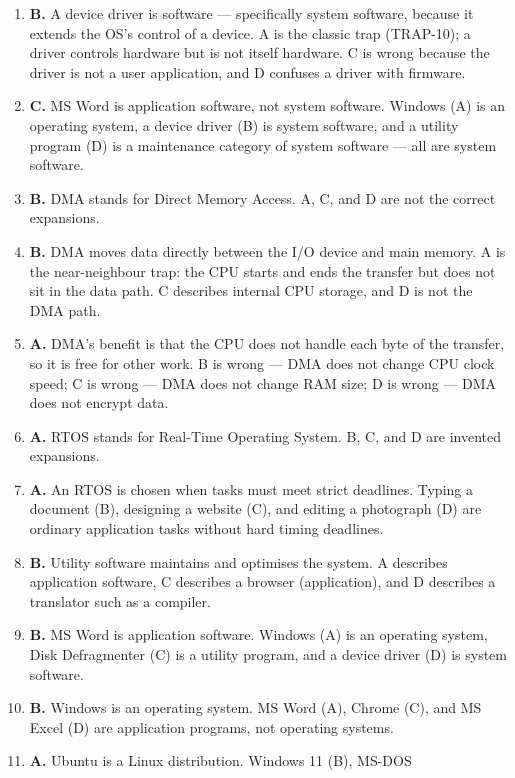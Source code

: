 \begin{enumerate}[label=\textbf{Q\arabic*.}, leftmargin=*]
\item \textbf{B.} A device driver is software --- specifically system
  software, because it extends the OS's control of a device. A is the
  classic trap (TRAP-10); a driver controls hardware but is not itself
  hardware. C is wrong because the driver is not a user application, and D
  confuses a driver with firmware.
\item \textbf{C.} MS Word is application software, not system software.
  Windows (A) is an operating system, a device driver (B) is system
  software, and a utility program (D) is a maintenance category of system
  software --- all are system software.
\item \textbf{B.} DMA stands for Direct Memory Access. A, C, and D are not
  the correct expansions.
\item \textbf{B.} DMA moves data directly between the I/O device and main
  memory. A is the near-neighbour trap: the CPU starts and ends the transfer
  but does not sit in the data path. C describes internal CPU storage, and D
  is not the DMA path.
\item \textbf{A.} DMA's benefit is that the CPU does not handle each byte of
  the transfer, so it is free for other work. B is wrong --- DMA does not
  change CPU clock speed; C is wrong --- DMA does not change RAM size; D is
  wrong --- DMA does not encrypt data.
\item \textbf{A.} RTOS stands for Real-Time Operating System. B, C, and D are
  invented expansions.
\item \textbf{A.} An RTOS is chosen when tasks must meet strict deadlines.
  Typing a document (B), designing a website (C), and editing a photograph
  (D) are ordinary application tasks without hard timing deadlines.
\item \textbf{B.} Utility software maintains and optimises the system. A
  describes application software, C describes a browser (application), and D
  describes a translator such as a compiler.
\item \textbf{B.} MS Word is application software. Windows (A) is an
  operating system, Disk Defragmenter (C) is a utility program, and a device
  driver (D) is system software.
\item \textbf{B.} Windows is an operating system. MS Word (A), Chrome (C),
  and MS Excel (D) are application programs, not operating systems.
\item \textbf{A.} Ubuntu is a Linux distribution. Windows 11 (B), MS-DOS

\end{enumerate}

